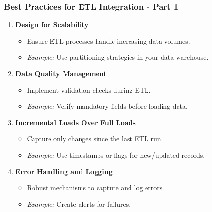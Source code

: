 \documentclass[aspectratio=169]{beamer}
\begin{document}
\begin{frame}[fragile]
    \frametitle{Best Practices for ETL Integration - Part 1}
    \begin{enumerate}
        \item \textbf{Design for Scalability}
            \begin{itemize}
                \item Ensure ETL processes handle increasing data volumes.
                \item \textit{Example:} Use partitioning strategies in your data warehouse.
            \end{itemize}
        
        \item \textbf{Data Quality Management}
            \begin{itemize}
                \item Implement validation checks during ETL.
                \item \textit{Example:} Verify mandatory fields before loading data.
            \end{itemize}

        \item \textbf{Incremental Loads Over Full Loads}
            \begin{itemize}
                \item Capture only changes since the last ETL run.
                \item \textit{Example:} Use timestamps or flags for new/updated records.
            \end{itemize}

        \item \textbf{Error Handling and Logging}
            \begin{itemize}
                \item Robust mechanisms to capture and log errors.
                \item \textit{Example:} Create alerts for failures.
            \end{itemize}
    \end{enumerate}
\end{frame}
\end{document}

